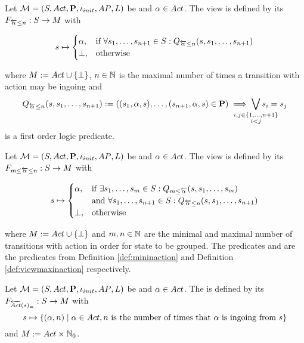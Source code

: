 \documentclass[preview]{standalone}
\begin{document}
\begin{definition}
	Let $\chgph = \chgphtuple$ be \chosengraphtypeN and $\action \in \actions$. The view \viewmaxinaction is defined by its \grpfctN $\gfctmaxinaction : \states \to \arbset$ with
	
	\[
	\state \mapsto
	\begin{cases}
		\action,				& \text{if } \forall \state_1, \dots, \state_{\numinact+1} \in \states: \predmaxinact \\
		\remelem,          	& \text{otherwise}
	\end{cases}
	\]
	
	where $\imggrp := \actions \cup \remset$, $\numinact \in \natnums$ is the maximal number of times a transition with action \action may be ingoing and 
	\[
	\predmaxinact := ((\state_1, \action, \state), \dots, (\state_{\numinact+1}, \action, \state) \in \trans) \implies \bigvee_{\mathclap{\substack{i,j \in \{1,\dots, \numinact+1\} \\ i < j}}} \state_i = \state_j
	\]
	is a first order logic predicate.
\end{definition}

\begin{definition}
	Let $\chgph = \chgphtuple$ be \chosengraphtypeN and $\action \in \actions$. The view 
	\viewspaninaction is defined by its \grpfctN $\gfctspaninaction : \states \to \arbset$ with
	
	\[
	\state \mapsto
	\begin{cases}
		\action,				& \text{if } \exists \state_1, \dots, \state_\numinactb \in \states: \predmininact[\numinactb] \\ &\text{and } \forall \state_1, \dots, \state_{\numinact+1} \in \states: \predmaxinact \\
		\remelem,          	& \text{otherwise}
	\end{cases}
	\]
	
	where $\imggrp := \actions \cup \remset$ and $\numinactb, \numinact \in \natnums$ are the minimal and maximal number of transitions with action \action in order for state to be grouped. The predicates \predmininact and \predmaxinact are the predicates from Definition \ref{def:mininaction} and Definition \ref{def:viewmaxinaction} respectively.
\end{definition}

\begin{definition}
	Let $\chgph = \chgphtuple$ be \chosengraphtypeN and $\action \in \actions$. The \viewN \viewstronginactident is defined by its \grpfctN $\gfctstronginactident : \states \to \imggrp$ with
	\[
	\state \mapsto	
	\{(\action, \numinact) \mid \action \in \actions, \numinact \text{ is the number of times that \action is ingoing from } \state\}
	\]
	and $\imggrp := \actions \times \natnums_0$.
\end{definition}
\end{document}
